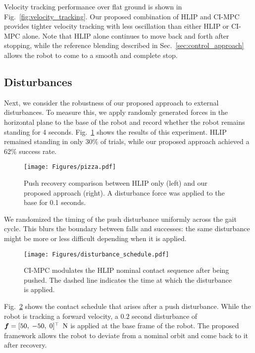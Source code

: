 Velocity tracking performance over flat ground is shown in Fig.~\ref{fig:velocity_tracking}. Our proposed combination of HLIP and CI-MPC provides tighter velocity tracking with less oscillation than either HLIP or CI-MPC alone. Note that HLIP alone continues to move back and forth after stopping, while the reference blending described in Sec.~\ref{sec:control_approach} allows the robot to come to a smooth and complete stop.

\subsection{Disturbances}
Next, we consider the robustness of our proposed approach to external disturbances. To measure this, we apply randomly generated forces in the horizontal plane to the base of the robot and record whether the robot remains standing for 4 seconds. Fig.~\ref{fig:disturbance_stats} shows the results of this experiment. HLIP remained standing in only 30\% of trials, while our proposed approach achieved a 62\% success rate.

\begin{figure}
    \vspace{10pt}
    \centering
    \texttt{[image: Figures/pizza.pdf]}
    \caption{Push recovery comparison between HLIP only (left) and our proposed approach (right). A disturbance force was applied to the base for 0.1 seconds.}
    \label{fig:disturbance_stats}
    \vspace{-10pt} 
\end{figure}


We randomized the timing of the push disturbance uniformly across the gait cycle. This blurs the boundary between falls and successes: the same disturbance might be more or less difficult depending when it is applied. 

\begin{figure} 
    \centering
    \texttt{[image: Figures/disturbance\_schedule.pdf]}
    \caption{CI-MPC modulates the HLIP nominal contact sequence after being pushed. The dashed line indicates the time at which the disturbance is applied.}
    \label{fig:disturbance_contact}
    \vspace{-14pt} 
\end{figure}

Fig.~\ref{fig:disturbance_contact} shows the contact schedule that arises after a push disturbance. While the robot is tracking a forward velocity, a $0.2$ second disturbance of $\boldsymbol{f} = [50, \; -50, \; 0]^\T$ $\rm N$ is applied at the base frame of the robot. The proposed framework allows the robot to deviate from a nominal orbit and come back to it after recovery.

